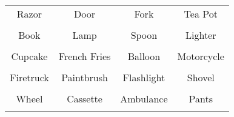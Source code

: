 \documentclass[12pt,a4paper]{article}
\begin{document}
\thispagestyle{empty}
\begin{table}[]
\centering
\Huge
\begin{tabular}{cccc}
 Razor& Door& Fork& Tea Pot\\  & & & \\
 Book& Lamp& Spoon& Lighter\\  & & & \\
 Cupcake& French Fries& Balloon& Motorcycle\\  & & & \\
 Firetruck& Paintbrush& Flashlight& Shovel\\  & & & \\
 Wheel& Cassette& Ambulance& Pants\\  & & & \\
\end{tabular}
\end{table}
\end{document}
